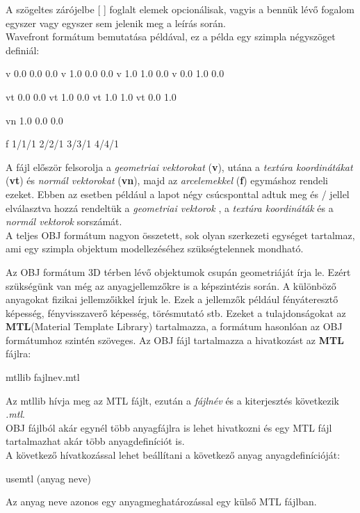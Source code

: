 \noindent A szögeltes zárójelbe [  ] foglalt elemek opcionálisak, vagyis a bennük lévő fogalom egyszer vagy egyszer sem jelenik meg a leírás során. \\

Wavefront formátum bemutatása példával, ez a példa egy szimpla négyszöget definiál:
\begin{python} 
v 0.0 0.0 0.0
v 1.0 0.0 0.0
v 1.0 1.0 0.0
v 0.0 1.0 0.0

vt 0.0 0.0
vt 1.0 0.0
vt 1.0 1.0
vt 0.0 1.0

vn 1.0 0.0 0.0 

f 1/1/1 2/2/1 3/3/1 4/4/1
\end{python}
\bigskip
A fájl először felsorolja a \textsl{geometriai vektorokat} (\textbf{v}), utána a \textsl{textúra koordinátákat} (\textbf{vt}) és \textsl{normál vektorokat} (\textbf{vn}), majd az \textsl{arcelemekkel} (\textbf{f}) egymáshoz rendeli ezeket. Ebben az esetben például a lapot négy csúcsponttal adtuk meg és {/} jellel elválasztva hozzá rendeltük a  \textsl{geometriai vektorok} , a \textsl{textúra koordináták} és a \textsl{normál vektorok} sorszámát.\\

A teljes OBJ formátum nagyon összetett, sok olyan szerkezeti egységet tartalmaz, ami egy szimpla objektum modellezéséhez szükségtelennek mondható.


Az OBJ formátum 3D térben lévő objektumok csupán geometriáját írja le. Ezért szükségünk van még az anyagjellemzőkre is a képszintézis során. A különböző anyagokat fizikai jellemzőikkel írjuk le. Ezek a jellemzők például fényáteresztő képesség, fényvisszaverő képesség, törésmutató stb.\cite{diane1995mtl}\newpage
Ezeket a tulajdonságokat az \textbf{MTL}(Material Template Library) tartalmazza, a formátum hasonlóan az OBJ formátumhoz szintén szöveges. Az OBJ fájl tartalmazza a hivatkozást az \textbf{MTL} fájlra:
\begin{python}
mtllib fajlnev.mtl
\end{python}
\bigskip
Az mtllib hívja meg az MTL fájlt, ezután a \textsl{fájlnév} és a kiterjesztés következik \textsl{.mtl}.\\
OBJ fájlból akár egynél több anyagfájlra is lehet hivatkozni és egy MTL fájl tartalmazhat akár több anyagdefiníciót is.\\

A következő hívatkozással lehet beállítani a következő anyag anyagdefinícióját:
\begin{python}
usemtl (anyag neve)
\end{python}
\bigskip
Az anyag neve azonos egy anyagmeghatározással egy külső MTL fájlban.\\

